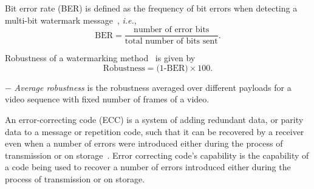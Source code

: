 \noindent Bit error rate (BER) is defined as the frequency of bit errors when detecting a multi-bit watermark message~\cite{ber}, \textit{i.e.},
\begin{equation}
\text{BER} = \frac{\text{number of error bits}}{\text{total number of bits sent}}.\nonumber
\label{chap2_ber}
\end{equation}

\noindent Robustness of a watermarking method~\cite{jana2006} is given by \vspace{-.2cm}
\begin{equation}
\text{Robustness} = \text{(1-BER)} \times \text{100}. \nonumber
\end{equation}

\noindent$-$ \textit{Average robustness} is the robustness averaged over different payloads for a video sequence with fixed number of frames of a video.\\


\noindent An error-correcting code (ECC) is a system of adding redundant data, or parity data to a message or repetition code, such that it can be recovered by a receiver even when a number of errors  were introduced either during the process of transmission or on storage~\cite{ECC2004}. Error correcting code\rq{}s capability is the capability of a code being used to recover a number of errors introduced either during the process of transmission or on storage.


